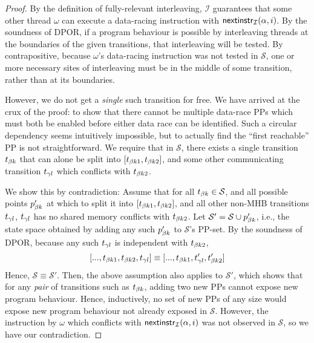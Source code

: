 \begin{proof}
By the definition of fully-relevant interleaving, $\mathcal{I}$ guarantees that some other thread $\omega$ can execute a data-racing instruction with $\mathsf{nextinstr}_{\mathcal{I}}(\alpha,i)$.
%
By the soundness of DPOR, if a program behaviour is possible by interleaving threads at the boundaries of
the given transitions, that interleaving will be tested.
By contrapositive,
because $\omega$'s data-racing instruction was not tested in $\mathcal{S}$, one or more necessary sites of interleaving must be in the middle of some transition, rather than at its boundaries.

However, we do not get a {\em single} such transition for free.
We have arrived at the crux of the proof:
to show that there cannot be multiple data-race PPs which must both be enabled before either data race can be identified.
Such a circular dependency seems intuitively impossible, but to actually find the ``first reachable'' PP is not straightforward.
We require that in $\mathcal{S}$, there exists a single transition $t_{\beta{}k}$ that can alone be split into $[t_{\beta{}k1},t_{\beta{}k2}]$,
and some other communicating transition $t_{\gamma{}l}$ which conflicts with $t_{\beta{}k2}$.

We show this by contradiction:
%
Assume that for all $t_{\beta{}k} \in \mathcal{S}$,
and all possible points $p_{\beta{}k}'$ at which to split it into $[t_{\beta{}k1},t_{\beta{}k2}]$,
and all other non-MHB transitions $t_{\gamma{}l}$,
$t_{\gamma{}l}$ has no shared memory conflicts with $t_{\beta{}k2}$.
%
Let $\mathcal{S}' = \mathcal{S} \cup p_{\beta{}k}'$, i.e., the state space obtained by adding any such $p_{\beta{}k}'$ to $\mathcal{S}$'s PP-set.
By the soundness of DPOR, because any such $t_{\gamma{}l}$ is independent with $t_{\beta{}k2}$,
\[
	[..., t_{\beta{}k1}, t_{\beta{}k2}, t_{\gamma{}l}]
	\equiv
	[..., t_{\beta{}k1}, t_{\gamma{}l}', t_{\beta{}k2}']
\]
Hence, $\mathcal{S} \equiv \mathcal{S}'$. %
Then, the above assumption also applies to $\mathcal{S}'$,
which shows that for any {\em pair} of transitions such as $t_{\beta{}k}$, adding two new PPs cannot expose new program behaviour.
Hence, inductively, no set of new PPs of any size would expose new program behaviour not already exposed in $\mathcal{S}$.
However, the instruction by $\omega$ which conflicts with $\mathsf{nextinstr}_{\mathcal{I}}(\alpha,i)$ was not observed in $\mathcal{S}$,
so we have our contradiction.


\end{proof}
